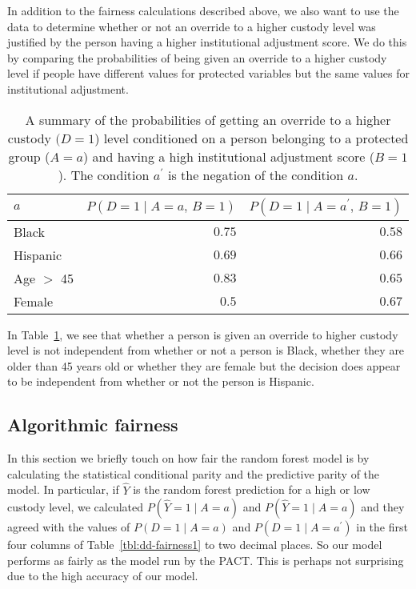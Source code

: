 \documentclass{amsproc}
\numberwithin{equation}{section}
\theoremstyle{plain}
\theoremstyle{remark}
\begin{document}
In addition to the fairness calculations described above, we also want to use the data to determine whether or not an override to a higher custody level was justified by the person having a higher institutional adjustment score. We do this by comparing the probabilities of being given an override to a higher custody level if people have different values for protected variables but the same values for institutional adjustment. 

\begin{table}
\begin{tabular}{|l||r|r|}\hline
$a$ & $P(D=1\mid A=a,\,B=1)$ & $P(D=1\mid A=a^\prime,\, B=1)$\\\hline
Black & $0.75$ & $0.58$\\\hline
Hispanic & $0.69$ & $0.66$\\\hline
Age $>$ 45 & $0.83$ & $0.65$\\\hline
Female & $0.5$ & $0.67$\\\hline
\end{tabular}
\caption{A summary of the probabilities of getting an override to a higher custody $(D=1$) level conditioned on a person belonging to a protected group ($A=a$) and having a high institutional adjustment score ($B=1$). The condition $a^\prime$ is the negation of the condition $a$.}\label{tbl:dd-fairness2}
\end{table}

In Table~\ref{tbl:dd-fairness2}, we see that whether a person is given an override to higher custody level is not independent from whether or not a person is Black, whether they are older than 45 years old or whether they are female but the decision does appear to be independent from whether or not the person is Hispanic.


\subsection{Algorithmic fairness}

In this section we briefly touch on how fair the random forest model is by calculating the statistical conditional parity and the predictive parity of the model.  In particular, if $\hat{Y}$ is the random forest prediction for a high or low custody level, we calculated $P(\hat{Y}=1\mid A=a)$ and $P(\hat{Y}=1\mid A=a)$ and they agreed with the values of $P(D=1\mid A=a)$ and $P(D=1\mid A=a^\prime)$ in the first four columns of Table~\ref{tbl:dd-fairness1} to two decimal places.  So our model performs as fairly as the model run by the PACT.  This is perhaps not surprising due to the high accuracy of our model.
\end{document}
